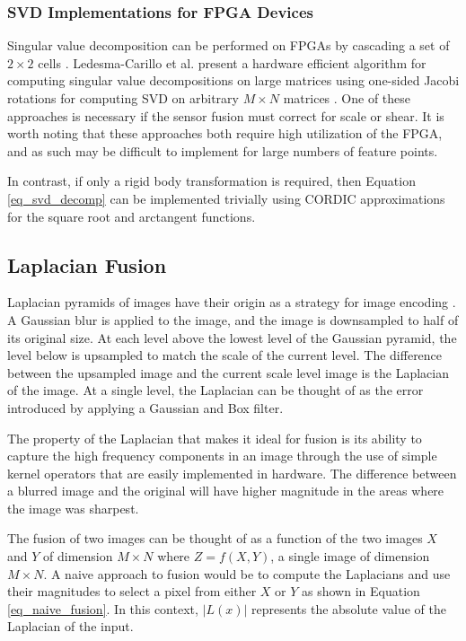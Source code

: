 \documentclass[sigconf]{acmart}
\begin{document}
\subsubsection{SVD Implementations for FPGA Devices}

Singular value decomposition can be performed on FPGAs by cascading a set of $2 \times 2$ cells \cite{wang_singular_2010}. Ledesma-Carillo et al. present a hardware efficient algorithm for computing singular value decompositions on large matrices using one-sided Jacobi rotations for computing SVD on arbitrary $M \times N$ matrices \cite{ledesma-carrillo_reconfigurable_2011}. One of these approaches is necessary if the sensor fusion must correct for scale or shear. It is worth noting that these approaches both require high utilization of the FPGA, and as such may be difficult to implement for large numbers of feature points.

In contrast, if only a rigid body transformation is required, then Equation \ref{eq_svd_decomp} can be implemented trivially using CORDIC approximations for the square root and arctangent functions.


\subsection{Laplacian Fusion}

Laplacian pyramids of images have their origin as a strategy for image encoding \cite{burt_laplacian_1983}. A Gaussian blur is applied to the image, and the image is downsampled to half of its original size. At each level above the lowest level of the Gaussian pyramid, the level below is upsampled to match the scale of the current level. The difference between the upsampled image and the current scale level image is the Laplacian of the image. At a single level, the Laplacian can be thought of as the error introduced by applying a Gaussian and Box filter.

The property of the Laplacian that makes it ideal for fusion is its ability to capture the high frequency components in an image through the use of simple kernel operators that are easily implemented in hardware. The difference between a blurred image and the original will have higher magnitude in the areas where the image was sharpest.

The fusion of two images can be thought of as a function of the two images $X$ and $Y$ of dimension $M \times N$ where $Z = f(X, Y)$, a single image of dimension $M \times N$. A naive approach to fusion would be to compute the Laplacians and use their magnitudes to select a pixel from either $X$ or $Y$ as shown in Equation \ref{eq_naive_fusion}. In this context, $|L(x)|$ represents the absolute value of the Laplacian of the input.
\end{document}
